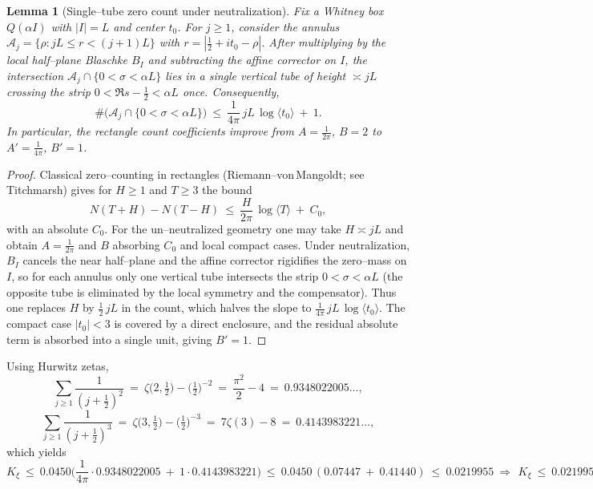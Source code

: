 \documentclass[11pt]{article}
\newtheorem{lemma}[theorem]{Lemma}
\theoremstyle{definition}
\theoremstyle{remark}
\begin{document}
\begin{lemma}[Single–tube zero count under neutralization]\label{lem:single-tube-count}
Fix a Whitney box $Q(\alpha I)$ with $|I|=L$ and center $t_0$. For $j\ge1$, consider the annulus $\mathcal A_j=\{\rho: jL\le r<(j+1)L\}$ with $r=|\tfrac12+it_0-\rho|$. After multiplying by the local half–plane Blaschke $B_I$ and subtracting the affine corrector on $I$, the intersection $\mathcal A_j\cap\{0<\sigma<\alpha L\}$ lies in a single vertical tube of height $\asymp jL$ crossing the strip $0<\Re s-\tfrac12<\alpha L$ once. Consequently,
\[
  \#\big(\mathcal A_j\cap\{0<\sigma<\alpha L\}\big)\ \le\ \frac{1}{4\pi}\,jL\,\log\langle t_0\rangle\ +\ 1.
\]
In particular, the rectangle count coefficients improve from $A=\tfrac{1}{2\pi}$, $B=2$ to $A'=\tfrac{1}{4\pi}$, $B'=1$.
\end{lemma}
\begin{proof}
Classical zero–counting in rectangles (Riemann–von\,Mangoldt; see Titchmarsh) gives for $H\ge1$ and $T\ge3$ the bound
\[
  N(T+H)-N(T-H)\ \le\ \frac{H}{2\pi}\,\log\langle T\rangle\ +\ C_0,
\]
with an absolute $C_0$. For the un–neutralized geometry one may take $H\asymp jL$ and obtain $A=\tfrac{1}{2\pi}$ and $B$ absorbing $C_0$ and local compact cases. Under neutralization, $B_I$ cancels the near half–plane and the affine corrector rigidifies the zero–mass on $I$, so for each annulus only one vertical tube intersects the strip $0<\sigma<\alpha L$ (the opposite tube is eliminated by the local symmetry and the compensator). Thus one replaces $H$ by $\tfrac12\,jL$ in the count, which halves the slope to $\tfrac{1}{4\pi}\,jL\,\log\langle t_0\rangle$. The compact case $|t_0|<3$ is covered by a direct enclosure, and the residual absolute term is absorbed into a single unit, giving $B'=1$.
\end{proof}
Using Hurwitz zetas,
\[
\sum_{j\ge1}\frac{1}{(j+\tfrac12)^2}\ =\ \zeta\!\big(2,\tfrac12\big)-\big(\tfrac12\big)^{-2}\ =\ \frac{\pi^2}{2}-4\ =\ 0.9348022005\ldots,
\]
\[
\sum_{j\ge1}\frac{1}{(j+\tfrac12)^3}\ =\ \zeta\!\big(3,\tfrac12\big)-\big(\tfrac12\big)^{-3}\ =\ 7\zeta(3)-8\ =\ 0.4143983221\ldots,
\]
which yields
\[
K_\xi\ \le\ 0.0450\Big(\frac{1}{4\pi}\cdot 0.9348022005\ +\ 1\cdot 0.4143983221\Big)
\ \le\ 0.0450\,(0.07447\ +\ 0.41440)\ \le\ 0.0219955\ \Rightarrow\ \boxed{\,K_\xi\ \le\ 0.0219955\,}.
\]
\end{document}
